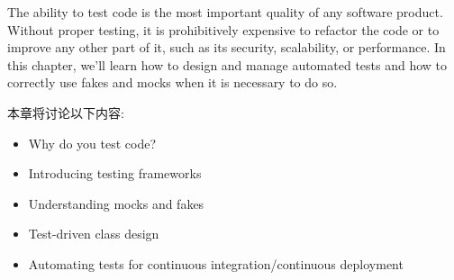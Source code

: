 
The ability to test code is the most important quality of any software product. Without proper testing, it is prohibitively expensive to refactor the code or to improve any other part of it, such as its security, scalability, or performance. In this chapter, we'll learn how to design and manage automated tests and how to correctly use fakes and mocks when it is necessary to do so.

本章将讨论以下内容:

\begin{itemize}
\item 
Why do you test code?

\item 
Introducing testing frameworks

\item 
Understanding mocks and fakes

\item 
Test-driven class design

\item 
Automating tests for continuous integration/continuous deployment
\end{itemize}